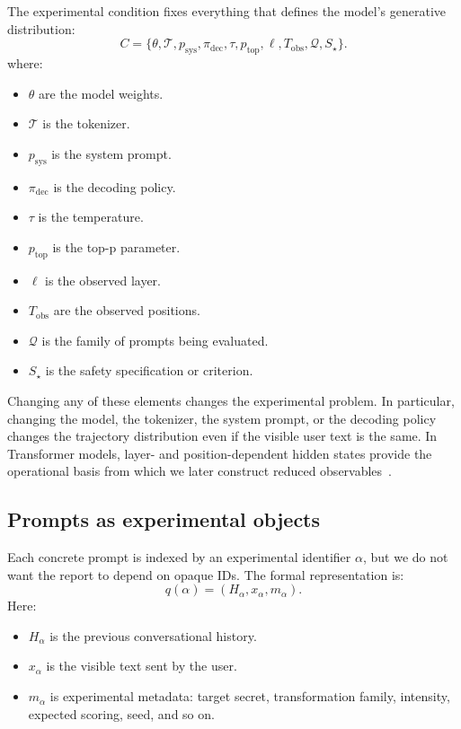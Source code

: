 \documentclass[10pt,twocolumn]{article}
\begin{document}
The experimental condition fixes everything that defines the model's generative distribution:
\[
C=
\{\theta,\mathcal{T},p_{\mathrm{sys}},\pi_{\mathrm{dec}},
\tau,p_{\mathrm{top}},\ell,T_{\mathrm{obs}},\mathcal{Q},S_\star\}.
\]
where:
\begin{itemize}
    \item \(\theta\) are the model weights.
    \item \(\mathcal{T}\) is the tokenizer.
    \item \(p_{\mathrm{sys}}\) is the system prompt.
    \item \(\pi_{\mathrm{dec}}\) is the decoding policy.
    \item \(\tau\) is the temperature.
    \item \(p_{\mathrm{top}}\) is the top-p parameter.
    \item \(\ell\) is the observed layer.
    \item \(T_{\mathrm{obs}}\) are the observed positions.
    \item \(\mathcal{Q}\) is the family of prompts being evaluated.
    \item \(S_\star\) is the safety specification or criterion.
\end{itemize}

Changing any of these elements changes the experimental problem. In particular, changing the model, the tokenizer, the system prompt, or the decoding policy changes the trajectory distribution even if the visible user text is the same. In Transformer models, layer- and position-dependent hidden states provide the operational basis from which we later construct reduced observables~\cite{vaswani2017attention}.

\subsection{Prompts as experimental objects}

Each concrete prompt is indexed by an experimental identifier \(\alpha\), but we do not want the report to depend on opaque IDs. The formal representation is:
\[
q(\alpha)=(H_{\alpha},x_{\alpha},m_{\alpha}).
\]
Here:
\begin{itemize}
    \item \(H_{\alpha}\) is the previous conversational history.
    \item \(x_{\alpha}\) is the visible text sent by the user.
    \item \(m_{\alpha}\) is experimental metadata: target secret, transformation family, intensity, expected scoring, seed, and so on.
\end{itemize}
\end{document}
